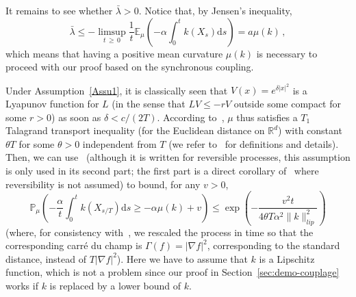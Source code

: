 \documentclass[10pt]{amsart}
\theoremstyle{definition}\newtheorem{defi}[theo]{Definition}\newtheorem{rema}[theo]{Remark}\newtheorem{exam}[theo]{Example}\newtheorem{exem}[theo]{Example}\newtheorem{nota}[theo]{Notation}
\newcommand{\R}{\mathbb R}
\newcommand{\bbP}{\mathbb P}
\newcommand{\bbE}{\mathbb E}
\newcommand{\dd}{\mathrm{d}}
\newcommand{\na}{\nabla}
\newcommand{\1}{\mathbbm{1}}
\begin{document}
It remains to see whether $\bar \lambda>0$. Notice that, by Jensen's inequality,
\[
\bar \lambda \leqslant - \limsup_{t\,\geqslant\,0} \frac{1}{t} \bbE_{\mu} \left( - \alpha \int_0^t k(X_s)\dd s \right) = a \mu(k)\,,
\]
which means that having a positive mean curvature $\mu(k)$ is necessary to proceed with our proof based on the synchronous coupling.

Under Assumption~\ref{Assu1}, it is classically seen that $V(x) = e^{\delta |x|^2}$ is a Lyapunov function for $L$ (in the sense that $LV \leqslant - r V$ outside some compact for some $r>0$) as soon as $\delta <c/(2T)$. According to~\cite[Theorem~2.3.]{Djellout}, $\mu$ thus satisfies a $T_1$ Talagrand transport inequality (for the Euclidean distance on $\R^d$) with constant $\theta T$ for some $\theta>0$ independent from $T$ (we refer to~\cite{Djellout} for definitions and details). Then, we can use~\cite[Corollary~2.4]{guillin2009transportation} (although it is written for reversible processes, this assumption is only used in its second part; the first part is a direct corollary of~\cite[Theorem~2.2]{guillin2009transportation} where reversibility is not assumed) to bound, for any $v > 0$,
\[
\bbP_\mu \left( - \frac\alpha{t} \int_0^t k(X_{s/T})\dd s \geqslant -\alpha \mu(k) + v \right) \leqslant \exp\left(- \frac{v^2 t }{4\theta T \alpha^2 \|k\|_{lip}^2}\right)
\]
(where, for consistency with~\cite{guillin2009transportation}, we rescaled the process in time so that the corresponding carré du champ is $\Gamma(f)=|\na f|^2$, corresponding to the standard distance, instead of $T|\na f|^2$). Here we have to assume that $k$ is a Lipschitz function, which is not a problem since our proof in Section~\ref{sec:demo-couplage} works if $k$ is replaced by a lower bound of $k$.
\end{document}

